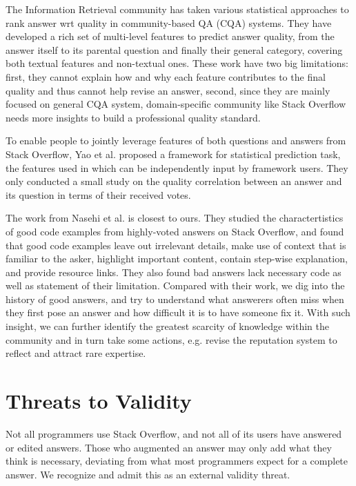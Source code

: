 \documentclass[10pt,conference]{IEEEtran}
\begin{document}
The Information Retrieval community has taken various statistical approaches to rank answer wrt quality in community-based QA (CQA) systems. \cite{DBLP:journals/corr/SugguGCS16, Dalip:2013:EUF:2484028.2484072, Shah:2010:EPA:1835449.1835518, 7857066} They have developed a rich set of multi-level features to predict answer quality, from the answer itself to its parental question and finally their general category, covering both textual features and non-textual ones. 
These work have two big limitations: first, they cannot explain how and why each feature contributes to the final quality and thus cannot help revise an answer, second, since they are mainly focused on general CQA system, domain-specific community like Stack Overflow needs more insights to build a professional quality standard.    

To enable people to jointly leverage features of both questions and answers from Stack Overflow, Yao et al. \cite{DBLP:journals/corr/YaoTXAXL13} proposed a framework for statistical prediction task, the features used in which can be independently input by framework users. 
They only conducted a small study on the quality correlation between an answer and its question in terms of their received votes.  

The work from Nasehi et al. \cite{DBLP:conf/icsm/NasehiSMB12} is closest to ours. 
They studied the charactertistics of good code examples from highly-voted answers on Stack Overflow, and found that good code examples leave out irrelevant details, make use of context that is familiar to the asker, highlight important content, contain step-wise explanation, and provide resource links. 
They also found bad answers lack necessary code as well as statement of their limitation. 
Compared with their work, we dig into the history of good answers, and try to understand what answerers often miss when they first pose an answer and how difficult it is to have someone fix it. 
With such insight, we can further identify the greatest scarcity of knowledge within the community and in turn take some actions, e.g. revise the reputation system to reflect and attract rare expertise.      

\section {Threats to Validity}
Not all programmers use Stack Overflow, and not all of its users have answered or edited answers. 
Those who augmented an answer may only add what they think is necessary, deviating from what most programmers expect for a complete answer. 
We recognize and admit this as an external validity threat. 
\end{document}
